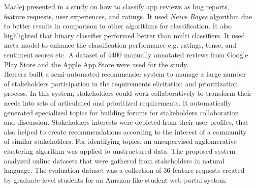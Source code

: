 Maalej presented in \cite{Maalej} a study on how to classify app reviews as bug
reports, feature requests, user experiences, and ratings. It used
\emph{Naive Bayes} algorithm due to better results in comparison to other algorithms for classification. It also highlighted that binary
classifier performed better than multi
classifiers. It used meta model to enhance the classification performance e.g. ratings,
tense, and sentiment scores etc. A
dataset of 4400 manually annotated reviews from Google Play Store and the Apple App
Store were used for the study.\\

Herrera \etal \cite{Castro-Herrera:2009} built a semi-automated recommender system to manage a large number of stakeholders participation in
the requirements elicitation and prioritization process. In this system, stakeholders could work collaboratively to transform their needs into sets
of articulated and prioritized requirements. It automatically
generated specialized topics for building forums for stakeholders collaboration and discussion. Stakeholders interests were depicted from their user profiles, that also helped to create recommendations according to the
interest of a community of similar stakeholders. For identifying topics, an unsupervised agglomerative clustering algorithm was
applied to unstructured data. The proposed system analyzed online
datasets that were gathered from stakeholders in natural language. 
The evaluation dataset was a collection of 36 feature requests created by
graduate-level students for an Amazon-like student web-portal system.






